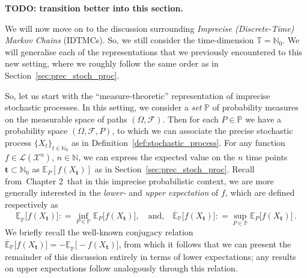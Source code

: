 \documentclass[graybox]{svmult}
\newcommand{\nats}{\mathbb{N}}
\newcommand{\natswith}{\nats_{0}}
\newcommand{\states}{\mathcal{X}}
\newcommand{\gambles}{\mathcal{L}}
\newcommand{\coloneqq}{:\!=}
\newcommand{\timedim}{\mathbb{T}}
\def\refIPChapter{Chapter 2}
\begin{document}
{\bf TODO: transition better into this section. }

We will now move on to the discussion surrounding \emph{Imprecise (Discrete-Time) Markov Chains} (IDTMCs). So, we still consider the time-dimension $\timedim=\natswith$. We will generalise each of the representations that we previously encountered to this new setting, where we roughly follow the same order as in Section~\ref{sec:prec_stoch_proc}. 

So, let us start with the ``measure-theoretic'' representation of imprecise stochastic processes. In this setting, we consider a \emph{set} $\mathbb{P}$ of probability measures on the measurable space of paths $(\Omega,\mathcal{F})$. Then for each $P\in\mathbb{P}$ we have a probability space $(\Omega,\mathcal{F},P)$, to which we can associate the precise stochastic process $\{X_t\}_{t\in\natswith}$ as in Definition~\ref{def:stochastic_process}. For any function $f\in\gambles(\states^n)$, $n\in\nats$, we can express the expected value on the $n$ time points $\mathbf{t}\subset\natswith$ as $\mathbb{E}_P[f(X_\mathbf{t})]$ as in Section~\ref{sec:prec_stoch_proc}. Recall from~\refIPChapter~that in this imprecise probabilistic context, we are more generally interested in the \emph{lower-} and \emph{upper expectation} of $f$, which are defined respectively as
\begin{equation*}
\underline{\mathbb{E}}_\mathbb{P}\bigl[f(X_\mathbf{t})\bigr] \coloneqq \inf_{P\in\mathbb{P}} \mathbb{E}_P\bigl[f(X_\mathbf{t})\bigr],\quad\text{and,}\quad \overline{\mathbb{E}}_\mathbb{P}\bigl[f(X_\mathbf{t})\bigr] \coloneqq \sup_{P\in\mathbb{P}} \mathbb{E}_P\bigl[f(X_\mathbf{t})\bigr]\,.
\end{equation*}
We briefly recall the well-known conjugacy relation $\overline{\mathbb{E}}_\mathbb{P}\bigl[f(X_\mathbf{t})\bigr]=-\underline{\mathbb{E}}_\mathbb{P}\bigl[-f(X_\mathbf{t})\bigr]$, from which it follows that we can present the remainder of this discussion entirely in terms of lower expectations; any results on upper expectations follow analogously through this relation.
\end{document}

